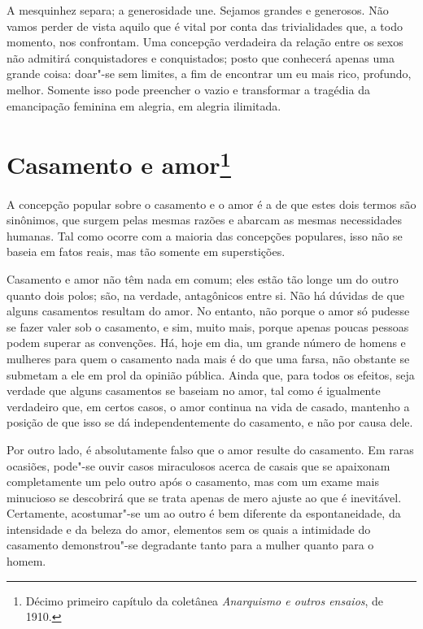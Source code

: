 A mesquinhez separa; a generosidade une. Sejamos grandes e generosos.
Não vamos perder de vista aquilo que é vital por conta das trivialidades
que, a todo momento, nos confrontam. Uma concepção verdadeira da relação\label{concepcao}
entre os sexos não admitirá conquistadores e conquistados; posto que
conhecerá apenas uma grande coisa: doar"-se sem limites, a fim de
encontrar um eu mais rico, profundo, melhor. Somente isso pode preencher
o vazio e transformar a tragédia da emancipação feminina em alegria, em
alegria ilimitada.

\chapter{Casamento e amor\footnote{Décimo primeiro capítulo da coletânea
  \textit{Anarquismo e outros ensaios}, de 1910.}}

A concepção popular sobre o casamento e o amor é a de que estes dois
termos são sinônimos, que surgem pelas mesmas razões e abarcam as mesmas
necessidades humanas. Tal como ocorre com a maioria das concepções
populares, isso não se baseia em fatos reais, mas tão somente em
superstições.

Casamento e amor não têm nada em comum; eles estão tão longe um do outro
quanto dois polos; são, na verdade, antagônicos entre si. Não há dúvidas
de que alguns casamentos resultam do amor. No entanto, não porque o
amor só pudesse se fazer valer sob o casamento, e sim, muito mais,
porque apenas poucas pessoas podem superar as convenções. Há, hoje em
dia, um grande número de homens e mulheres para quem o casamento nada
mais é do que uma farsa, não obstante se submetam a ele em prol da
opinião pública. Ainda que, para todos os efeitos, seja verdade que
alguns casamentos se baseiam no amor, tal como é igualmente verdadeiro
que, em certos casos, o amor continua na vida de casado, mantenho
a posição de que isso se dá independentemente do casamento, e
não por causa dele.

Por outro lado, é absolutamente falso que o amor resulte do casamento.
Em raras ocasiões, pode"-se ouvir casos miraculosos acerca de casais que
se apaixonam completamente um pelo outro após o casamento, mas com um
exame mais minucioso se descobrirá que se trata apenas de mero ajuste ao
que é inevitável. Certamente, acostumar"-se um ao outro é bem diferente
da espontaneidade, da intensidade e da beleza do amor, elementos sem os
quais a intimidade do casamento demonstrou"-se degradante tanto para a
mulher quanto para o homem.

